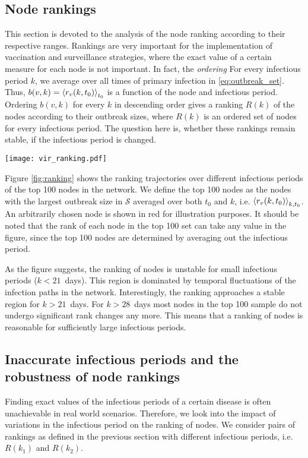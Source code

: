 \subsection{Node rankings}
This section is devoted to the analysis of the node ranking according to their respective ranges.
Rankings are very important for the implementation of vaccination and surveillance strategies, where the exact value of a certain measure for each node is not important.
In fact, the \emph{ordering}
For every infectious period $k$, we average over all times of primary infection in \eqref{eq:outbreak_set}.
Thus, $b(v,k)=\left< r_v(k,t_0) \right>_{t_0}$ is a function of the node and infectious period.
Ordering $b(v,k)$ for every $k$ in descending order gives a ranking $R(k)$ of the nodes according to their outbreak sizes, where $R(k)$ is an ordered set of nodes for every infectious period.
The question here is, whether these rankings remain stable, if the infectious period is changed.
%
\begin{SCfigure}
\texttt{[image: vir\_ranking.pdf]}
\caption{Node ranking of the top 100 nodes over different infectious periods.
Rankings are computed by averaging \eqref{eq:outbreak_set} over the time of primary infection.
Top 100 nodes are the nodes with the largest outbreak sizes averaged over $k$ and $t_0$.
The rankings of an arbitrary node are shown in red for illustration purposes.}
\label{fig:ranking}
\end{SCfigure}

Figure \ref{fig:ranking} shows the ranking trajectories over different infectious periods of the top 100 nodes in the network. 
We define the top 100 nodes as the nodes with the largest outbreak size in $\mathcal{S}$ averaged over both $t_0$ and $k$, i.e. $\left< r_v(k,t_0) \right>_{k,t_0}$.
An arbitrarily chosen node is shown in red for illustration purposes.
It should be noted that the rank of each node in the top 100 set can take any value in the figure, since the top 100 nodes are determined by averaging out the infectious period.

As the figure suggests, the ranking of nodes is unstable for small infectious periods ($k<21$~days).
This region is dominated by temporal fluctuations of the infection paths in the network.
Interestingly, the ranking approaches a stable region for $k>21$~days.
For $k>28$~days most nodes in the top 100 sample do not undergo significant rank changes any more.
This means that a ranking of nodes is reasonable for sufficiently large infectious periods.

\subsection{Inaccurate infectious periods and the robustness of node rankings}
Finding exact values of the infectious periods of a certain disease is often unachievable in real world scenarios.
Therefore, we look into the impact of variations in the infectious period on the ranking of nodes.
We consider pairs of rankings as defined in the previous section with different infectious periods, i.e. $R(k_1)$ and $R(k_2)$.

